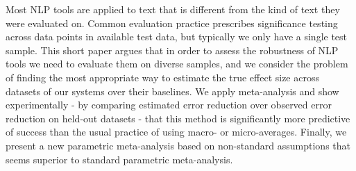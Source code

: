 Most NLP tools are applied to text that is different from the kind of text they were evaluated on. Common evaluation practice prescribes significance testing
 across data points in available test data, but typically we only have a single
 test sample. This short paper argues that in order to assess the robustness of
 NLP tools we need to evaluate them on diverse samples, and we consider the
 problem of finding the most appropriate way to estimate the true effect size
 across datasets of our systems over their baselines. We apply meta-analysis and
 show experimentally - by comparing estimated error reduction over observed
 error reduction on held-out datasets - that this method is significantly more
 predictive of success than the usual practice of using macro- or
 micro-averages. Finally, we present a new parametric meta-analysis based on
 non-standard assumptions that seems superior to standard parametric
 meta-analysis.


